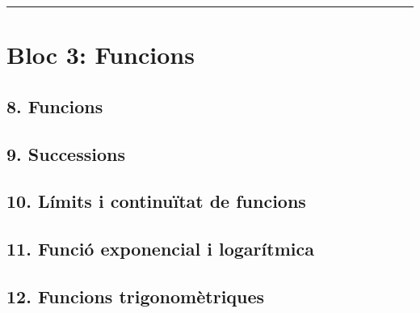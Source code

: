 \documentclass[]{article}
\begin{document}
\begin{center}\rule{0.5\linewidth}{\linethickness}\end{center}

\section{Bloc 3: Funcions}\label{bloc-3-funcions}

\subsection{8. Funcions}\label{funcions}

\subsection{9. Successions}\label{successions}

\subsection{10. Límits i continuïtat de
funcions}\label{luxedmits-i-continuuxeftat-de-funcions}

\subsection{11. Funció exponencial i
logarítmica}\label{funciuxf3-exponencial-i-logaruxedtmica}

\subsection{12. Funcions
trigonomètriques}\label{funcions-trigonomuxe8triques}
\end{document}
